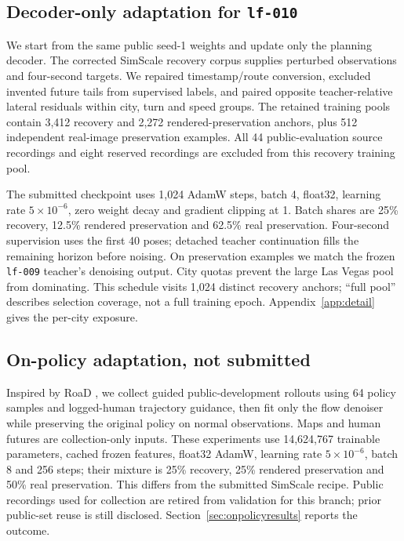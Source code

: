 \documentclass{article}
\newcommand{\lf}{\texttt{lf-009}}
\begin{document}
\subsection{Decoder-only adaptation for \texttt{lf-010}}\label{sec:lf010}
We start from the same public seed-1 weights and update only the planning decoder. The corrected SimScale recovery corpus supplies perturbed observations and four-second targets. We repaired timestamp/route conversion, excluded invented future tails from supervised labels, and paired opposite teacher-relative lateral residuals within city, turn and speed groups. The retained training pools contain 3,412 recovery and 2,272 rendered-preservation anchors, plus 512 independent real-image preservation examples. All 44 public-evaluation source recordings and eight reserved recordings are excluded from this recovery training pool.

The submitted checkpoint uses 1,024 AdamW steps, batch 4, float32, learning rate $5\times10^{-6}$, zero weight decay and gradient clipping at 1. Batch shares are 25\% recovery, 12.5\% rendered preservation and 62.5\% real preservation. Four-second supervision uses the first 40 poses; detached teacher continuation fills the remaining horizon before noising. On preservation examples we match the frozen \lf{} teacher's denoising output. City quotas prevent the large Las Vegas pool from dominating. This schedule visits 1,024 distinct recovery anchors; ``full pool'' describes selection coverage, not a full training epoch. Appendix~\ref{app:detail} gives the per-city exposure.

\subsection{On-policy adaptation, not submitted}\label{sec:onpolicy}
Inspired by RoaD \cite{road}, we collect guided public-development rollouts using 64 policy samples and logged-human trajectory guidance, then fit only the flow denoiser while preserving the original policy on normal observations. Maps and human futures are collection-only inputs. These experiments use 14,624,767 trainable parameters, cached frozen features, float32 AdamW, learning rate $5\times10^{-6}$, batch 8 and 256 steps; their mixture is 25\% recovery, 25\% rendered preservation and 50\% real preservation. This differs from the submitted SimScale recipe. Public recordings used for collection are retired from validation for this branch; prior public-set reuse is still disclosed. Section~\ref{sec:onpolicyresults} reports the outcome.
\end{document}

